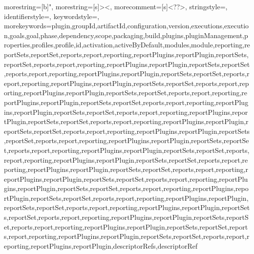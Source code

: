 
\usepackage[left=2cm, right=2cm, bottom=3cm, top=3cm]{geometry}
\usepackage{fancyhdr}%
\usepackage{graphicx} %
\graphicspath{ {../../../images/} }

\usepackage[hidelinks]{hyperref} %
\usepackage{tikz}
\usepackage{tgadventor} %
\usepackage[useregional=numeric,showseconds=true,showzone=false]{datetime2}
\usepackage{caption}

\usepackage{hyperref}
\usepackage{tocloft}
\usepackage{titlesec}
\usepackage{xcolor}
\usepackage{ulem}
\usepackage{pgfplots}
\usepackage{pgf-pie}
\usepackage[italian]{babel}
\usepackage{listings}
\usepackage{tabularx}
\usepackage{longtable}
\usepackage{listings}
\usepackage{amsmath}


{
	morestring=[b]",
	morestring=[s]{>}{<},
	morecomment=[s]{<?}{?>},
	stringstyle=\color{black},
	identifierstyle=\color{darkblue},
	keywordstyle=\color{cyan},
	morekeywords={plugin,groupId,artifactId,configuration,version,executions,execution,goals,goal,phase,dependency,scope,packaging,build,plugins,pluginManagement,properties,profiles,profile,id,activation,activeByDefault,modules,module,reporting,reportSets,reportSet,reports,report,reporting,reportPlugins,reportPlugin,reportSets,reportSet,reports,report,reporting,reportPlugins,reportPlugin,reportSets,reportSet,reports,report,reporting,reportPlugins,reportPlugin,reportSets,reportSet,reports,report,reporting,reportPlugins,reportPlugin,reportSets,reportSet,reports,report,reporting,reportPlugins,reportPlugin,reportSets,reportSet,reports,report,reporting,reportPlugins,reportPlugin,reportSets,reportSet,reports,report,reporting,reportPlugins,reportPlugin,reportSets,reportSet,reports,report,reporting,reportPlugins,reportPlugin,reportSets,reportSet,reports,report,reporting,reportPlugins,reportPlugin,reportSets,reportSet,reports,report,reporting,reportPlugins,reportPlugin,reportSets,reportSet,reports,report,reporting,reportPlugins,reportPlugin,reportSets,reportSet,reports,report,reporting,reportPlugins,reportPlugin,reportSets,reportSet,reports,report,reporting,reportPlugins,reportPlugin,reportSets,reportSet,reports,report,reporting,reportPlugins,reportPlugin,reportSets,reportSet,reports,report,reporting,reportPlugins,reportPlugin,reportSets,reportSet,reports,report,reporting,reportPlugins,reportPlugin,reportSets,reportSet,reports,report,reporting,reportPlugins,reportPlugin,reportSets,reportSet,reports,report,reporting,reportPlugins,reportPlugin,reportSets,reportSet,reports,report,reporting,reportPlugins,reportPlugin,reportSets,reportSet,reports,report,reporting,reportPlugins,reportPlugin,reportSets,reportSet,reports,report,reporting,reportPlugins,reportPlugin,reportSets,reportSet,reports,report,reporting,reportPlugins,reportPlugin,reportSets,reportSet,reports,report,reporting,reportPlugins,reportPlugin,descriptorRefs,descriptorRef}
}
